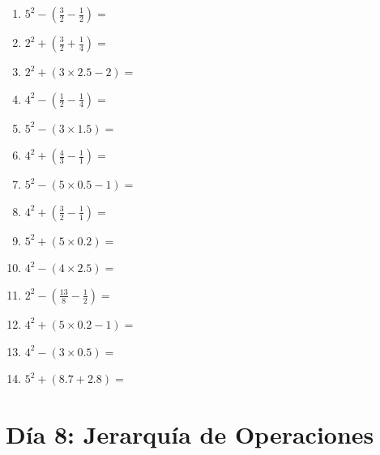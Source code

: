 \documentclass[12pt]{article}
\begin{document}
\begin{enumerate}
\item \large $ 5^{2} - (\frac{3}{2} - \frac{1}{2}) = $ \vspace{1.4cm}
\item \large $ 2^{2} + (\frac{3}{2} + \frac{1}{4}) = $ \vspace{1.4cm}
\newpage
\item \large $ 2^{2} + (3 \times 2.5 - 2) = $ \vspace{1.4cm}
\item \large $ 4^{2} - (\frac{1}{2} - \frac{1}{4}) = $ \vspace{1.4cm}
\item \large $ 5^{2} - (3 \times 1.5) = $ \vspace{1.4cm}
\item \large $ 4^{2} + (\frac{4}{3} - \frac{1}{1}) = $ \vspace{1.4cm}
\item \large $ 5^{2} - (5 \times 0.5 - 1) = $ \vspace{1.4cm}
\item \large $ 4^{2} + (\frac{3}{2} - \frac{1}{1}) = $ \vspace{1.4cm}
\item \large $ 5^{2} + (5 \times 0.2) = $ \vspace{1.4cm}
\item \large $ 4^{2} - (4 \times 2.5) = $ \vspace{1.4cm}
\item \large $ 2^{2} - (\frac{13}{8} - \frac{1}{2}) = $ \vspace{1.4cm}
\item \large $ 4^{2} + (5 \times 0.2 - 1) = $ \vspace{1.4cm}
\newpage
\item \large $ 4^{2} - (3 \times 0.5) = $ \vspace{1.4cm}
\item \large $ 5^{2} + (8.7 + 2.8) = $ \vspace{1.4cm}
\end{enumerate}
\newpage
\section*{Día 8: Jerarquía de Operaciones}
\end{document}
